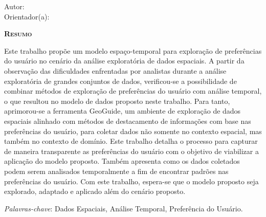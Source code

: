 \begin{center}
	{\Large{\textbf{\myThesis}}}
\end{center}

\vspace{1cm}

\begin{flushright}
	Autor: \myName\\
	Orientador(a): \mySupervisorName
\end{flushright}

\vspace{1cm}

\begin{center}
	\Large{\textsc{\textbf{Resumo}}}
\end{center}

\noindent Este trabalho propõe um modelo espaço-temporal para exploração de preferências do usuário no cenário da análise exploratória de dados espaciais. A partir da observação das dificuldades enfrentadas por analistas durante a análise exploratória de grandes conjuntos de dados, verificou-se a possibilidade de combinar métodos de exploração de preferências do usuário com análise temporal, o que resultou no modelo de dados proposto neste trabalho. Para tanto, aprimorou-se a ferramenta GeoGuide, um ambiente de exploração de dados espaciais alinhado com métodos de destacamento de informações com base nas preferências do usuário, para coletar dados não somente no contexto espacial, mas também no contexto de domínio. Este trabalho detalha o processo para capturar de maneira transparente as preferências do usuário com o objetivo de viabilizar a aplicação do modelo proposto. Também apresenta como os dados coletados podem serem analisados temporalmente a fim de encontrar padrões nas preferências do usuário. Com este trabalho, espera-se que o modelo proposto seja explorado, adaptado e aplicado além do cenário proposto.

\noindent\textit{Palavras-chave}: Dados Espaciais, Análise Temporal, Preferência do Usuário.